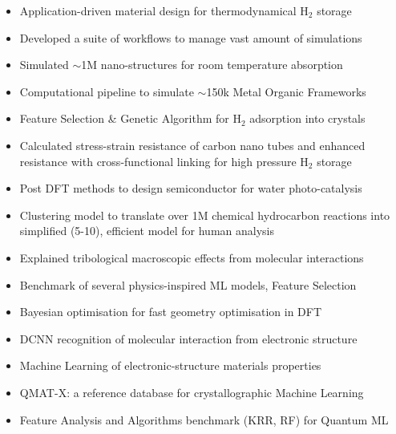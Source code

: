 \documentclass[10pt,a4paper,ragged2e,withhyper]{altacv}
\begin{document}
\begin{paracol}{2}
\begin{itemize}
\item Application-driven material design for thermodynamical H$_2$ storage
\item Developed a suite of workflows to manage vast amount of simulations
\item Simulated $\sim$1M nano-structures for room temperature absorption
\item Computational pipeline to simulate $\sim$150k Metal Organic Frameworks
\item Feature Selection \& Genetic Algorithm for H$_2$ adsorption into crystals 
\item Calculated stress-strain resistance of carbon nano tubes and enhanced resistance with cross-functional linking for high pressure H$_2$ storage
\item Post DFT methods to design semiconductor for water photo-catalysis 
\end{itemize}
\divider

\begin{itemize}
\item Clustering model to translate over 1M chemical hydrocarbon reactions into simplified (5-10), efficient model for human analysis
\end{itemize}
\divider

\begin{itemize}
\item Explained tribological macroscopic effects from molecular interactions
\item Benchmark of several physics-inspired ML models, Feature Selection
\end{itemize}
\divider

\begin{itemize}
\item Bayesian optimisation for fast geometry optimisation in DFT
\item DCNN recognition of molecular interaction from electronic structure
\end{itemize}
\divider

\begin{itemize}
\item Machine Learning of electronic-structure materials properties
\item QMAT-X: a reference database for crystallographic Machine Learning 
\item Feature Analysis and Algorithms benchmark (KRR, RF) for Quantum ML
\end{itemize}
\divider


\end{paracol}
\end{document}
